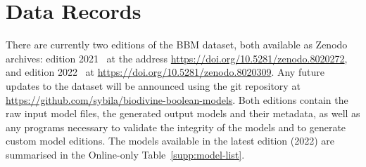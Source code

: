 \documentclass[fleqn,10pt]{wlscirep}
\begin{document}

\section*{Data Records}

There are currently two editions of the BBM dataset, both available as Zenodo archives: edition 2021~\cite{bbm2021} at the address \hyperlink{https://doi.org/10.5281/zenodo.8020272}{https://doi.org/10.5281/zenodo.8020272}, and edition 2022~\cite{bbm2022} at \hyperlink{https://doi.org/10.5281/zenodo.8020309}{https://doi.org/10.5281/zenodo.8020309}. Any future updates to the dataset will be announced using the git repository at \hyperlink{https://github.com/sybila/biodivine-boolean-models}{https://github.com/sybila/biodivine-boolean-models}. Both editions contain the raw input model files, the generated output models and their metadata, as well as any programs necessary to validate the integrity of the models and to generate custom model editions. The models available in the latest edition (2022) are summarised in the Online-only Table~\ref{supp:model-list}.


\end{document}
